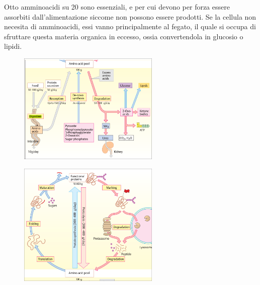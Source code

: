 \documentclass[a4paper]{article}
\begin{document}

Otto amminoacidi su 20 sono essenziali, e per cui devono per forza essere assorbiti dall'alimentazione
siccome non possono essere prodotti. 
Se la cellula non necesita di amminoacidi, essi vanno principalmente al fegato, il quale si occupa
di sfruttare questa materia organica in eccesso, ossia convertendola in glucosio o lipidi.

\begin{center}
\begin{figure}[th]
    \centering
    \includegraphics[width=0.6\textwidth]{./ciclo_amminoacidi.png}
\end{figure}
\end{center}

\begin{center}
\begin{figure}[th]
    \centering
    \includegraphics[width=0.6\textwidth]{./protein_metabolism.png}
\end{figure}
\end{center}
\end{document}
